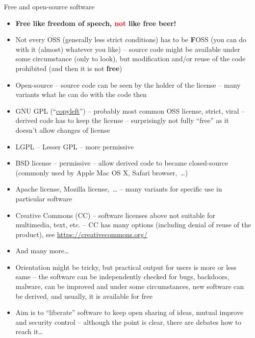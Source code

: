 \documentclass[compress, ucs, xelatex, 11pt, xcolor=svgnames,
  hyperref={
    bookmarks=true,
    unicode=true,
    colorlinks=true,
    pdftitle={Linux, command line and MetaCentrum},
    plainpages=false,
    pdfauthor={Vojtech Zeisek},
    pdfsubject={Course about use of Linux command line, writing shell scripts and using MetaCentrum of CESNET},
    pdfcreator={XeLaTeX},
    pdfkeywords={Linux, GNU, BASH, shell, command line, MetaCentrum},
    linkcolor=Red,
    anchorcolor=Blue,
    citecolor=Purple,
    filecolor=DodgerBlue,
    menucolor=DarkOrchid,
    urlcolor=DeepSkyBlue,
    pdftex},
  url={hyphens, lowtilde} %
  ]{beamer}
\renewcommand{\alert}[1]{\textcolor{red}{#1}}
\begin{document}
\begin{frame}[allowframebreaks]{Free and open-source software}
\begin{itemize}
  \item \textbf{Free like freedom of speech, \alert{not} like free beer!}
  \item Not every OSS (generally less strict conditions) has to be \textbf{F}OSS (you can do with it (almost) whatever you like) -- source code might be available under some circumstance (only to look), but modification and/or reuse of the code prohibited (and then it is not \textbf{free})
  \item Open-source -- source code can be seen by the holder of the license -- many variants what he can do with the code then
  \item GNU GPL (``\href{https://www.gnu.org/copyleft/}{copyleft}'') -- probably most common OSS license, strict, viral -- derived code has to keep the license -- surprisingly not fully ``free'' as it doesn't allow changes of license
  \item LGPL -- Lesser GPL -- more permissive
  \item BSD license -- permissive -- allow derived code to became closed-source (commonly used by Apple Mac OS X, Safari browser,~\ldots)
  \item Apache license, Mozilla license,~\ldots{ }-- many variants for specific use in particular software
  \item Creative Commons (CC) -- software licenses above not suitable for multimedia, text, etc. -- CC has many options (including denial of reuse of the product), see \url{https://creativecommons.org/}
  \item And many more\ldots
  \item Orientation might be tricky, but practical output for users is more or less same -- the software can be independently checked for bugs, backdoors, malware, can be improved and under some circumstances, new software can be derived, and usually, it is available for free
  \item Aim is to ``liberate'' software to keep open sharing of ideas, mutual improve and security control -- although the point is clear, there are debates how to reach it\ldots
\end{itemize}
\end{frame}
\end{document}

